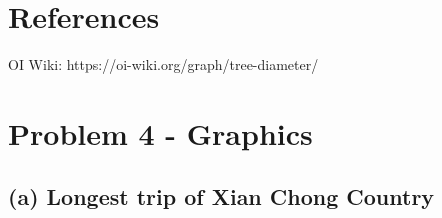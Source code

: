 \documentclass[12pt, a4paper, UTF8]{article}
\begin{document}
\pagestyle{fancy}
\fancyhead{} %
\fancyfoot{} %
\fancyfoot[C]{\thepage}
\section*{References}
    OI Wiki: https://oi-wiki.org/graph/tree-diameter/
    \pagebreak
\section*{Problem 4 - Graphics}
    \subsection*{(a) Longest trip of Xian Chong Country}
\end{document}
